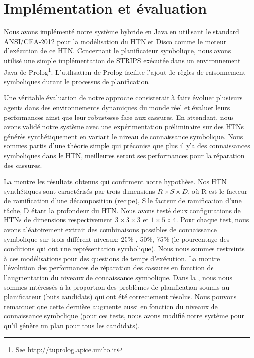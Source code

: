 \documentclass[a4paper,twoside,french]{article}
\begin{document}
	\section{Implémentation et évaluation}
	Nous avons implémenté notre système hybride en Java en utilisant le standard ANSI/CEA-2012 \cite{rich2009building} pour la modélisation du HTN et Disco \cite{rich2012using} comme le moteur d'exécution de ce HTN. Concernant le planificateur symbolique, nous avons utilisé une simple implémentation de STRIPS  exécutée dans un environnement Java de Prolog\footnote{See http://tuprolog.apice.unibo.it}. L'utilisation de Prolog facilite l'ajout de règles de raisonnement symboliques durant le processus de planification. 
	\par Une véritable évaluation de notre approche consisterait à faire évoluer plusieurs agents dans des environnements dynamiques du monde réel et évaluer leurs performances ainsi que leur robustesse face aux cassures. En attendant, nous avons validé notre système avec une expérimentation préliminaire sur des HTNs générés synthétiquement en variant le niveau de connaissance symbolique. Nous sommes partis d'une théorie simple qui préconise que plus il y'a des connaissances symboliques dans le HTN, meilleures seront ses performances pour la réparation des cassures.
		\par La  montre les résultats obtenus qui confirment notre hypothèse. Nos HTN synthétiques sont caractérisés par trois dimensions $R \times S \times D$, où R est le facteur de ramification d'une décomposition (recipe), S le facteur de ramification d'une tâche, D étant la profondeur du HTN. Nous avons testé deux configurations de HTNs de dimensions respectivement $3\times 3\times 3$ et $1\times 5\times 4$. Pour chaque test, nous avons aléatoirement extrait des combinaisons possibles de connaissance symbolique sur trois différent niveaux; 25\% , 50\%, 75\% (le pourcentage des conditions qui ont une représentation symbolique). Nous nous sommes restreints à ces modélisations pour des questions de temps d'exécution. La  montre l'évolution des performances de réparation des cassures en fonction de l'augmentation du niveaux de connaissance symbolique. Dans la , nous nous sommes intéressés à la proportion des problèmes de planification soumis au planificateur (buts candidats) qui ont été correctement résolus. Nous pouvons remarquer que cette dernière augmente aussi en fonction du niveaux de connaissance symbolique (pour ces tests, nous avons modifié notre système pour qu'il génère un plan pour tous les candidats).
\end{document}
